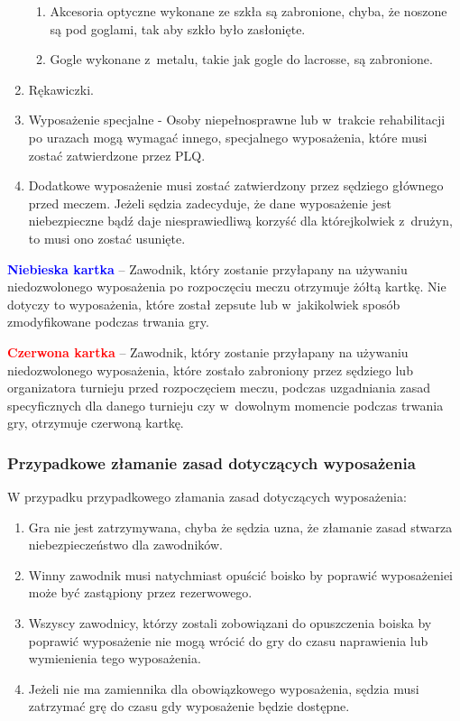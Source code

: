 \documentclass[12pt]{article}
\newcommand\redcard[1]{\bgroup\textcolor{red}{\textbf{#1}}}
\newcommand\bluecard[1]{\bgroup\textcolor{blue}{\textbf{#1}}}
\begin{document}
\begin{enumerate}
	      \begin{enumerate}
		      \item
		            Akcesoria optyczne wykonane ze szkła są zabronione, chyba, że
		            noszone są pod goglami, tak aby szkło było zasłonięte.
		      \item
		            Gogle wykonane z~metalu, takie jak gogle do lacrosse, są zabronione.
	      \end{enumerate}
	\item
	      Rękawiczki.
	\item
	      Wyposażenie specjalne - Osoby niepełnosprawne lub w~trakcie
	      rehabilitacji po urazach mogą wymagać innego, specjalnego wyposażenia,
	      które musi zostać zatwierdzone przez PLQ.
	\item
	      Dodatkowe wyposażenie musi zostać zatwierdzony przez sędziego
	      głównego przed meczem. Jeżeli sędzia zadecyduje, że dane wyposażenie
	      jest niebezpieczne bądź daje niesprawiedliwą korzyść dla którejkolwiek
	      z~drużyn, to musi ono zostać usunięte.
\end{enumerate}

\bluecard{Niebieska kartka} -- Zawodnik, który zostanie przyłapany na
używaniu niedozwolonego wyposażenia po rozpoczęciu meczu otrzymuje żółtą
kartkę. Nie dotyczy to wyposażenia, które został zepsute lub w~jakikolwiek sposób zmodyfikowane podczas trwania gry.

\redcard{Czerwona kartka} -- Zawodnik, który zostanie przyłapany na używaniu
niedozwolonego wyposażenia, które zostało zabroniony przez sędziego lub
organizatora turnieju przed rozpoczęciem meczu, podczas uzgadniania
zasad specyficznych dla danego turnieju czy w~dowolnym momencie podczas
trwania gry, otrzymuje czerwoną kartkę.

\subsubsection{Przypadkowe złamanie zasad dotyczących wyposażenia}
W przypadku przypadkowego złamania zasad dotyczących wyposażenia:

\begin{enumerate}
	\item
	      Gra nie jest zatrzymywana, chyba że sędzia uzna, że złamanie zasad
	      stwarza niebezpieczeństwo dla zawodników.
	\item
	      Winny zawodnik musi natychmiast opuścić boisko by poprawić
	      wyposażeniei może być zastąpiony przez rezerwowego.
	\item
	      Wszyscy zawodnicy, którzy zostali zobowiązani do opuszczenia boiska by
	      poprawić wyposażenie nie mogą wrócić do gry do czasu naprawienia lub
	      wymienienia tego wyposażenia.
	\item
	      Jeżeli nie ma zamiennika dla obowiązkowego wyposażenia, sędzia musi
	      zatrzymać grę do czasu gdy wyposażenie będzie dostępne.
\end{enumerate}
\end{document}
